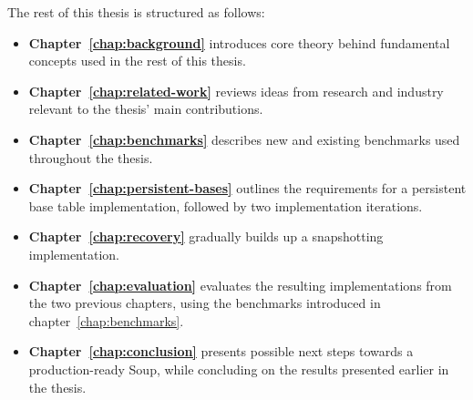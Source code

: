 The rest of this thesis is structured as follows:

\begin{itemize}
  \item \textbf{Chapter~\ref{chap:background}} introduces core theory behind fundamental
  concepts used in the rest of this thesis.
  \item \textbf{Chapter~\ref{chap:related-work}} reviews ideas from research and
  industry relevant to the thesis' main contributions.
  \item \textbf{Chapter~\ref{chap:benchmarks}} describes new and existing
  benchmarks used throughout the thesis.
  \item \textbf{Chapter~\ref{chap:persistent-bases}} outlines the requirements
  for a persistent base table implementation, followed by two implementation
  iterations.
  \item \textbf{Chapter~\ref{chap:recovery}} gradually builds up a snapshotting
  implementation.
  \item \textbf{Chapter~\ref{chap:evaluation}} evaluates the resulting
  implementations from the two previous chapters, using the benchmarks
  introduced in chapter~\ref{chap:benchmarks}.
  \item \textbf{Chapter~\ref{chap:conclusion}} presents possible next steps
  towards a production-ready Soup, while concluding on the results presented
  earlier in the thesis.
\end{itemize}
